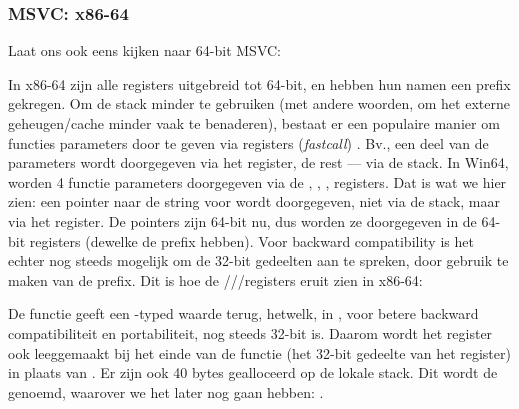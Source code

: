 \subsubsection{MSVC: x86-64}

Laat ons ook eens kijken naar 64-bit MSVC:




In x86-64 zijn alle registers uitgebreid tot 64-bit, en hebben hun namen een  prefix gekregen.
Om de stack minder te gebruiken (met andere woorden, om het externe geheugen/cache minder vaak te benaderen), bestaat
er een populaire manier om functies parameters door te geven via registers (\emph{fastcall}) .
Bv., een deel van de parameters wordt doorgegeven via het register, de rest --- via de stack.
In Win64, worden 4 functie parameters doorgegeven via de \RCX, \RDX, ,  registers.
Dat is wat we hier zien: een pointer naar de string voor \printf wordt doorgegeven, niet via de stack, maar via het \RCX register.
De pointers zijn 64-bit nu, dus worden ze doorgegeven in de 64-bit registers (dewelke de  prefix hebben).
Voor backward compatibility is het echter nog steeds mogelijk om de 32-bit gedeelten aan te spreken, door gebruik te maken van de  prefix.
Dit is hoe de \RAX/\EAX/\AX/\AL registers eruit zien in x86-64:


De \main functie geeft een \Tint{}-typed waarde terug, hetwelk, in \CCpp, voor betere backward compatibiliteit
en portabiliteit, nog steeds 32-bit is. Daarom wordt het \EAX register ook leeggemaakt bij het einde van de functie
(het 32-bit gedeelte van het register) in plaats van \RAX{}.
Er zijn ook 40 bytes gealloceerd op de lokale stack.
Dit wordt de  genoemd, waarover we het later nog gaan hebben: .

